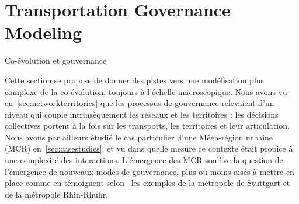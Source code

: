 




\section{Transportation Governance Modeling}{Co-évolution et gouvernance} 


\label{sec:lutecia}





Cette section se propose de donner des pistes vers une modélisation plus complexe de la co-évolution, toujours à l'échelle macroscopique. Nous avons vu en~\ref{sec:networkterritories} que les processus de gouvernance relevaient d'un niveau qui couple intrinsèquement les réseaux et les territoires : les décisions collectives portent à la fois sur les transports, les territoires et leur articulation. Nous avons par ailleurs étudié le cas particulier d'une Méga-région urbaine (MCR) en~\ref{sec:casestudies}, et vu dans quelle mesure ce contexte était propice à une complexité des interactions. L'émergence des MCR soulève la question de l'émergence de nouveaux modes de gouvernance, plus ou moins aisés à mettre en place comme en témoignent selon~\cite{lenechet2017peupler} les exemples de la métropole de Stuttgart et de la métropole Rhin-Rhuhr.

